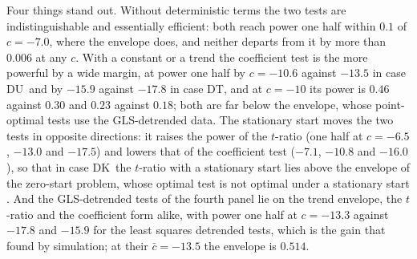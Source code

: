 \documentclass[ecta,nameyear,final]{econsocart}
\newcommand{\Fk}{\textsf{\upshape DK}}
\newcommand{\Fu}{\textsf{\upshape DU}}
\newcommand{\Ft}{\textsf{\upshape DT}}
\theoremstyle{plain}
\theoremstyle{definition}
\begin{document}
Four things stand out.  Without deterministic terms the two tests are indistinguishable and essentially efficient: both reach power one half within $0.1$ of $c=-7.0$, where the envelope does, and neither departs from it by more than $0.006$ at any $c$.  With a constant or a trend the coefficient test is the more powerful by a wide margin, at power one half by $c=-10.6$ against $-13.5$ in case \Fu\ and by $-15.9$ against $-17.8$ in case \Ft, and at $c=-10$ its power is $0.46$ against $0.30$ and $0.23$ against $0.18$; both are far below the envelope, whose point-optimal tests use the GLS-detrended data.  The stationary start moves the two tests in opposite directions: it raises the power of the $t$-ratio (one half at $c=-6.5$, $-13.0$ and $-17.5$) and lowers that of the coefficient test ($-7.1$, $-10.8$ and $-16.0$), so that in case \Fk\ the $t$-ratio with a stationary start lies above the envelope of the zero-start problem, whose optimal test is not optimal under a stationary start \citep{Elliott1999}.  And the GLS-detrended tests of the fourth panel lie on the trend envelope, the $t$-ratio and the coefficient form alike, with power one half at $c=-13.3$ against $-17.8$ and $-15.9$ for the least squares detrended tests, which is the gain that \cite{ElliottRothenbergStock1996} found by simulation; at their $\bar c=-13.5$ the envelope is $0.514$.
\end{document}
